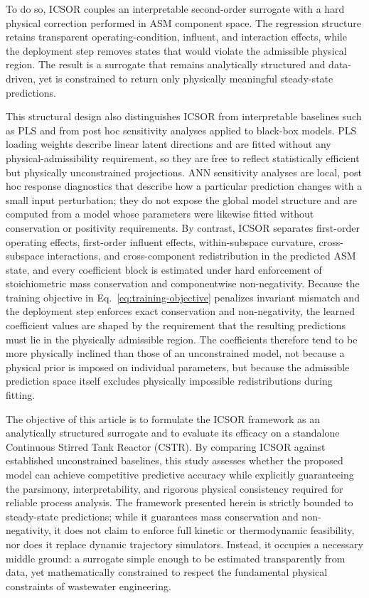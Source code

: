\documentclass[a4paper,fleqn]{cas-sc}
\newcommand{\revitem}[2]{\textcolor{#1}{#2}}
\newenvironment{revblock}{\begingroup\color{revDefault}}{\endgroup}
\begin{document}
\begin{revblock}
To do so, ICSOR couples an interpretable second-order surrogate with a hard physical correction performed in ASM component space. The regression structure retains transparent operating-condition, influent, and interaction effects, while the deployment step removes states that would violate the admissible physical region. The result is a surrogate that remains analytically structured and data-driven, yet is constrained to return only physically meaningful steady-state predictions.

\revitem{revRtwoOne}{This structural design also distinguishes ICSOR from interpretable baselines such as PLS and from post hoc sensitivity analyses applied to black-box models. PLS loading weights describe linear latent directions and are fitted without any physical-admissibility requirement, so they are free to reflect statistically efficient but physically unconstrained projections. ANN sensitivity analyses are local, post hoc response diagnostics that describe how a particular prediction changes with a small input perturbation; they do not expose the global model structure and are computed from a model whose parameters were likewise fitted without conservation or positivity requirements. By contrast, ICSOR separates first-order operating effects, first-order influent effects, within-subspace curvature, cross-subspace interactions, and cross-component redistribution in the predicted ASM state, and every coefficient block is estimated under hard enforcement of stoichiometric mass conservation and componentwise non-negativity. Because the training objective in Eq.~\eqref{eq:training-objective} penalizes invariant mismatch and the deployment step enforces exact conservation and non-negativity, the learned coefficient values are shaped by the requirement that the resulting predictions must lie in the physically admissible region. The coefficients therefore tend to be more physically inclined than those of an unconstrained model, not because a physical prior is imposed on individual parameters, but because the admissible prediction space itself excludes physically impossible redistributions during fitting.}

The objective of this article is to formulate the ICSOR framework as an analytically structured surrogate and to evaluate its efficacy on a standalone Continuous Stirred Tank Reactor (CSTR). By comparing ICSOR against established unconstrained baselines, this study assesses whether the proposed model can achieve competitive predictive accuracy while explicitly guaranteeing the parsimony, interpretability, and rigorous physical consistency required for reliable process analysis. The framework presented herein is strictly bounded to steady-state predictions; while it guarantees mass conservation and non-negativity, it does not claim to enforce full kinetic or thermodynamic feasibility, nor does it replace dynamic trajectory simulators. Instead, it occupies a necessary middle ground: a surrogate simple enough to be estimated transparently from data, yet mathematically constrained to respect the fundamental physical constraints of wastewater engineering.
\end{revblock}
\end{document}
